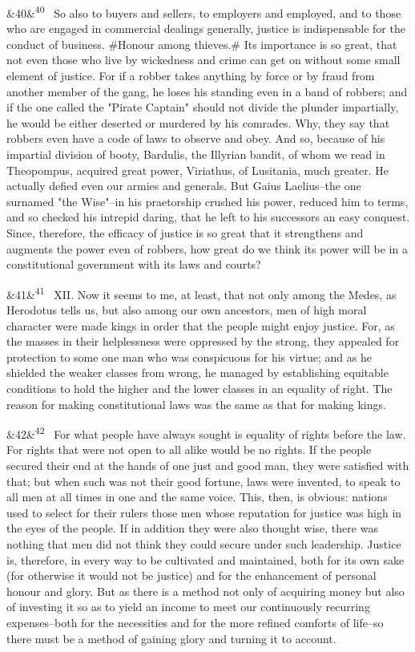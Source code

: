 \documentclass[12pt]{article}
\newcommand{\para}[1][]{\par\noindent\ifx&#1&\else\textsuperscript{\footnotesize #1}~\fi}
\begin{document}
\para[40] So also to buyers and sellers, to employers and employed, and to those who are engaged in commercial dealings generally, justice is indispensable for the conduct of business. \#Honour among thieves.\# Its importance is so great, that not even those who live by wickedness and crime can get on without some small element of justice. For if a robber takes anything by force or by fraud from another member of the gang, he loses his standing even in a band of robbers; and if the one called the "Pirate Captain" should not divide the plunder impartially, he would be either deserted or murdered by his comrades. Why, they say that robbers even have a code of laws to observe and obey. And so, because of his impartial division of booty, Bardulis, the Illyrian bandit, of whom we read in Theopompus, acquired great power, Viriathus, of Lusitania, much greater. He actually defied even our armies and generals. But Gaius Laelius--the one surnamed "the Wise"--in his praetorship crushed his power, reduced him to terms, and so checked his intrepid daring, that he left to his successors an easy conquest. Since, therefore, the efficacy of justice is so great that it strengthens and augments the power even of robbers, how great do we think its power will be in a constitutional government with its laws and courts?

\para[41] XII. Now it seems to me, at least, that not only among the Medes, as Herodotus tells us, but also among our own ancestors, men of high moral character were made kings in order that the people might enjoy justice. For, as the masses in their helplessness were oppressed by the strong, they appealed for protection to some one man who was conspicuous for his virtue; and as he shielded the weaker classes from wrong, he managed by establishing equitable conditions to hold the higher and the lower classes in an equality of right. The reason for making constitutional laws was the same as that for making kings.

\para[42] For what people have always sought is equality of rights before the law. For rights that were not open to all alike would be no rights. If the people secured their end at the hands of one just and good man, they were satisfied with that; but when such was not their good fortune, laws were invented, to speak to all men at all times in one and the same voice. This, then, is obvious: nations used to select for their rulers those men whose reputation for justice was high in the eyes of the people. If in addition they were also thought wise, there was nothing that men did not think they could secure under such leadership. Justice is, therefore, in every way to be cultivated and maintained, both for its own sake (for otherwise it would not be justice) and for the enhancement of personal honour and glory. But as there is a method not only of acquiring money but also of investing it so as to yield an income to meet our continuously recurring expenses--both for the necessities and for the more refined comforts of life--so there must be a method of gaining glory and turning it to account.
\end{document}

